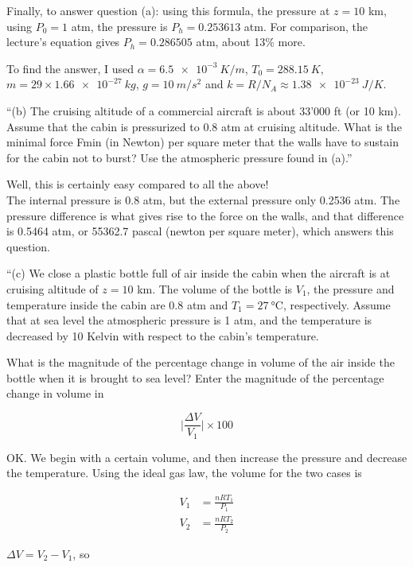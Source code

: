 \documentclass[8.01x]{subfiles}
\begin{document}
Finally, to answer question (a): using this formula, the pressure at $z = 10$ km, using $P_0 = 1$ atm, the pressure is $P_h = 0.253613$ atm. For comparison, the lecture's equation gives $P_h = 0.286505$ atm, about 13\% more.

To find the answer, I used $\alpha = \SI{6.5e-3}{K/m}$, $T_0 = \SI{288.15}{K}$, $m = 29 \times \SI{1.66e-27}{kg}$, $g = \SI{10}{m/s^2}$ and $k = R/N_A \approx \SI{1.38e-23}{J/K}$.

``(b) The cruising altitude of a commercial aircraft is about 33'000 ft (or 10 km). Assume that the cabin is pressurized to 0.8 atm at cruising altitude. What is the minimal force Fmin (in Newton) per square meter that the walls have to sustain for the cabin not to burst? Use the atmospheric pressure found in (a).''

Well, this is certainly easy compared to all the above!\\
The internal pressure is 0.8 atm, but the external pressure only 0.2536 atm. The pressure difference is what gives rise to the force on the walls, and that difference is 0.5464 atm, or 55362.7 pascal (newton per square meter), which answers this question.

``(c) We close a plastic bottle full of air inside the cabin when the aircraft is at cruising altitude of $z = 10$ km. The volume of the bottle is $V_1$, the pressure and temperature inside the cabin are 0.8 atm and $T_1 = \SI{27}{\degreeCelsius}$, respectively. Assume that at sea level the atmospheric pressure is 1 atm, and the temperature is decreased by 10 Kelvin with respect to the cabin's temperature.

What is the magnitude of the percentage change in volume of the air inside the bottle when it is brought to sea level? Enter the magnitude of the percentage change in volume in

\begin{equation}
\Big| \frac{\Delta V}{V_1} \Big| \times 100
\end{equation}

OK. We begin with a certain volume, and then increase the pressure and decrease the temperature. Using the ideal gas law, the volume for the two cases is

\begin{align}
V_1 &= \frac{n R T_1}{P_1}\\
V_2 &= \frac{n R T_2}{P_2}
\end{align}

$\Delta V = V_2 - V_1$, so
\end{document}
